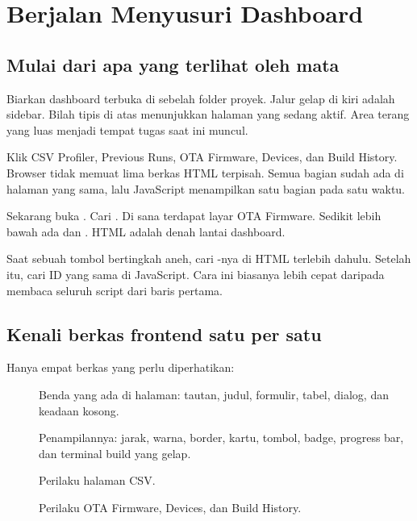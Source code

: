 \chapter{Berjalan Menyusuri Dashboard}

\section{Mulai dari apa yang terlihat oleh mata}

Biarkan dashboard terbuka di sebelah folder proyek. Jalur gelap di kiri adalah sidebar. Bilah tipis di atas menunjukkan halaman yang sedang aktif. Area terang yang luas menjadi tempat tugas saat ini muncul.

Klik CSV Profiler, Previous Runs, OTA Firmware, Devices, dan Build History. Browser tidak memuat lima berkas HTML terpisah. Semua bagian sudah ada di halaman yang sama, lalu JavaScript menampilkan satu bagian pada satu waktu.

Sekarang buka . Cari . Di sana terdapat layar OTA Firmware. Sedikit lebih bawah ada  dan . HTML adalah denah lantai dashboard.

\begin{mentorbox}
Saat sebuah tombol bertingkah aneh, cari -nya di HTML terlebih dahulu. Setelah itu, cari ID yang sama di JavaScript. Cara ini biasanya lebih cepat daripada membaca seluruh script dari baris pertama.
\end{mentorbox}

\section{Kenali berkas frontend satu per satu}

Hanya empat berkas yang perlu diperhatikan:

\begin{description}
  \item[] Benda yang ada di halaman: tautan, judul, formulir, tabel, dialog, dan keadaan kosong.
  \item[] Penampilannya: jarak, warna, border, kartu, tombol, badge, progress bar, dan terminal build yang gelap.
  \item[] Perilaku halaman CSV.
  \item[] Perilaku OTA Firmware, Devices, dan Build History.
\end{description}

